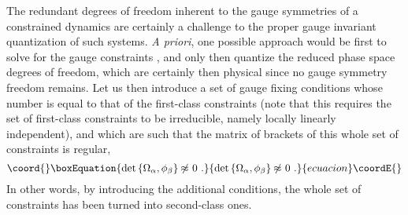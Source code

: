 \documentclass[a4paper,11pt]{article}
\begin{document}
The redundant degrees of freedom inherent to the gauge symmetries of
a constrained dynamics are certainly a challenge to the proper gauge invariant
quantization of such systems. {\sl A priori\/}, one possible approach would
be first to solve for the gauge constraints \myHighlight{$\phi_\alpha$}\coordHE{}, and only then
quantize the reduced phase space degrees of freedom, which are certainly
then physical since no gauge symmetry freedom remains. Let us then introduce
a set of gauge fixing conditions \coordHE{} whose number is equal to 
that of the first-class constraints \myHighlight{$\phi_\alpha$}\coordHE{} (note that this requires
the set of first-class constraints to be irreducible, namely locally
linearly independent), and which are such that
the matrix of brackets of this whole set of constraints is regular,
\begin{equation}\coord{}\boxEquation{
{\rm det}\,\{\Omega_\alpha,\phi_\beta\}\not{\!\!\approx}\ 0\ .
\label{eq:2ndclass}
}{
{\rm det}\,\{\Omega_\alpha,\phi_\beta\}\not{\!\!\approx}\ 0\ .
}{ecuacion}\coordE{}\end{equation}
In other words, by introducing the additional conditions, the whole
set of constraints has been turned into second-class ones.
\end{document}
